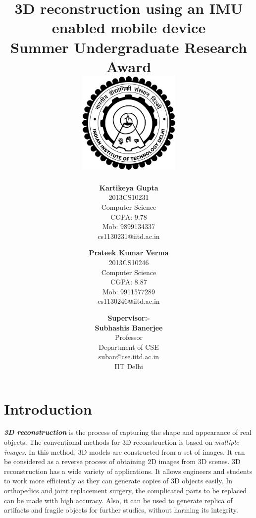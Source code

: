 \documentclass{article}
\title{\vspace*{\fill} \textbf{3D reconstruction using an IMU enabled mobile device}
	  \\ {\large \textbf{Summer Undergraduate Research Award}}
	  \\  \vspace{3mm} \includegraphics[width=5cm]{logo.png}}
\author{
	\textbf{Kartikeya Gupta}\\ 
	2013CS10231\\
	Computer Science\\
	CGPA: 9.78 \\
	Mob: 9899134337\\
	cs1130231@iitd.ac.in
	\and
	\textbf{Prateek Kumar Verma}\\ 
	2013CS10246\\
	Computer Science\\
	CGPA: 8.87\\
	Mob: 9911577289\\
	cs1130246@iitd.ac.in
}
\date{\textbf{Supervisor:-} \\ \textbf{Subhashis Banerjee} \\ Professor \\ Department of CSE \\ suban@cse.iitd.ac.in\\ IIT Delhi\\
\vspace*{\fill}}
\makeatletter
\newcommand{\namesigdate}[2][5cm]{%
  \begin{tabular}{@{}p{#1}@{}}
    #2 \\[0.4\normalbaselineskip] \hrule \\[0pt]
    {\small } \\[2\normalbaselineskip] 
  \end{tabular}
}
\makeatother
\begin{document}






	\newpage
	
	\section{Introduction}
		\textit{\textbf{3D reconstruction}} is the process of capturing the shape and appearance of real objects. The conventional methods for 3D reconstruction is based on \textit{multiple images}. In this method, 3D models are constructed from a set of images. It can be considered as a reverse process of obtaining 2D images from 3D scenes.
		\newline
		3D reconstruction has a wide variety of applications. It allows engineers and students to work more efficiently as they can generate copies of 3D objects easily. In orthopedics and joint replacement surgery, the complicated parts to be replaced can be made with high accuracy. Also, it can be used to generate replica of artifacts and fragile objects for further studies, without harming its integrity.
\end{document}
